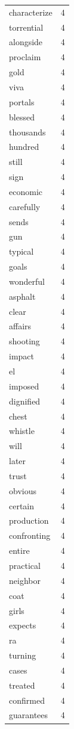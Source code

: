 \begin{tabular}{lr}
characterize & 4 \\
torrential & 4 \\
alongside & 4 \\
proclaim & 4 \\
gold & 4 \\
viva & 4 \\
portals & 4 \\
blessed & 4 \\
thousands & 4 \\
hundred & 4 \\
still & 4 \\
sign & 4 \\
economic & 4 \\
carefully & 4 \\
sends & 4 \\
gun & 4 \\
typical & 4 \\
goals & 4 \\
wonderful & 4 \\
asphalt & 4 \\
clear & 4 \\
affairs & 4 \\
shooting & 4 \\
impact & 4 \\
el & 4 \\
imposed & 4 \\
dignified & 4 \\
chest & 4 \\
whistle & 4 \\
will & 4 \\
later & 4 \\
trust & 4 \\
obvious & 4 \\
certain & 4 \\
production & 4 \\
confronting & 4 \\
entire & 4 \\
practical & 4 \\
neighbor & 4 \\
coat & 4 \\
girls & 4 \\
expects & 4 \\
ra & 4 \\
turning & 4 \\
cases & 4 \\
treated & 4 \\
confirmed & 4 \\
guarantees & 4 \\

\end{tabular}
